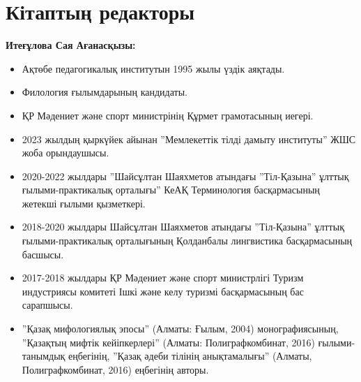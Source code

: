 \chapter*{Кітаптың редакторы}

\textbf{Итеғұлова Сая Ағанасқызы:}

\begin{itemize}
\item Ақтөбе педагогикалық институтын 1995 жылы үздік аяқтады.
\item Филология ғылымдарының кандидаты.
\item ҚР Мәдениет және спорт министрінің Құрмет грамотасының иегері.
\item 2023 жылдың қыркүйек айынан ''Мемлекеттік тілді дамыту институты'' ЖШС жоба орындаушысы.
\item 2020-2022 жылдары ''Шайсұлтан Шаяхметов атындағы ''Тіл-Қазына'' ұлттық ғылыми-практикалық орталығы'' КеАҚ Терминология басқармасының жетекші ғылыми қызметкері.
\item 2018-2020 жылдары Шайсұлтан Шаяхметов атындағы ''Тіл-Қазына'' ұлттық ғылыми-практикалық орталығының Қолданбалы лингвистика басқармасының басшысы.
\item 2017-2018 жылдары ҚР Мәдениет және спорт министрлігі Туризм индустриясы комитеті Ішкі және келу туризмі басқармасының бас сарапшысы.
\item ''Қазақ мифологиялық эпосы'' (Алматы: Ғылым, 2004) монографиясының, ''Қазақтың мифтік кейіпкерлері'' (Алматы: Полиграфкомбинат, 2016) ғылыми-танымдық еңбегінің, ''Қазақ әдеби тілінің анықтамалығы'' (Алматы, Полиграфкомбинат, 2016) еңбегінің авторы.

\end{itemize}


